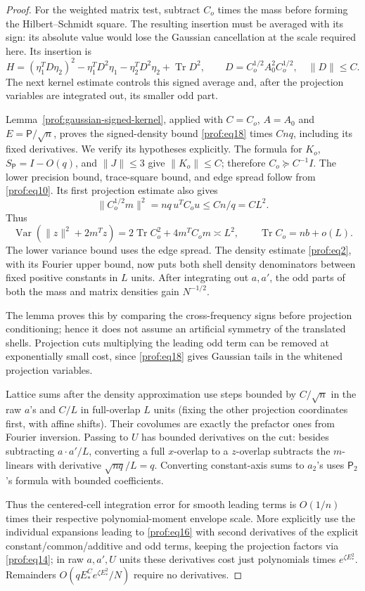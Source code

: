 \begin{proof}
For the weighted matrix test, subtract $C_o$ times the mass before
forming the Hilbert--Schmidt square. The resulting insertion must be
averaged with its sign: its absolute value would lose the Gaussian
cancellation at the scale required here. Its insertion is
\[
 H=(\eta_1^TD\eta_2)^2-\eta_1^TD^2\eta_1-
   \eta_2^TD^2\eta_2+\operatorname{Tr}D^2,
 \qquad D=C_o^{1/2}A_0^2C_o^{1/2},\quad \|D\|\le C.
\]
The next kernel estimate controls this signed average and, after the
projection variables are integrated out, its smaller odd part.

Lemma~\ref{prof:gaussian-signed-kernel}, applied with $C=C_o$,
$A=A_0$ and $E=\mathsf P/\sqrt n$, proves the signed-density bound
\eqref{prof:eq18} times $Cnq$, including its fixed derivatives.
We verify its hypotheses explicitly. The formula for $K_o$,
$S_{\mathsf P}=I-O(q)$, and $\|J\|\le3$ give $\|K_o\|\le C$;
therefore $C_o\succeq C^{-1}I$. The lower precision bound,
trace-square bound, and edge spread follow from \eqref{prof:eq10}.
Its first projection estimate also gives
\[
 \|C_o^{1/2}m\|^2=nq\,u^TC_ou\le Cn/q=CL^2.
\]
Thus
\[
 \operatorname{Var}(\|z\|^2+2m^Tz)
 =2\operatorname{Tr}C_o^2+4m^TC_om\asymp L^2,
 \qquad \operatorname{Tr}C_o=nb+o(L).
\]
The lower variance bound uses the edge spread. The density estimate
\eqref{prof:eq2}, with its Fourier upper bound, now puts both shell
density denominators between fixed positive constants in $L$ units.
After integrating out $a,a'$, the odd parts of both the mass and matrix
densities gain $N^{-1/2}$.

The lemma proves this by comparing the
cross-frequency signs before projection conditioning; hence it does
not assume an artificial symmetry of the translated shells.
Projection cuts multiplying the leading odd term can be removed at
exponentially small cost, since \eqref{prof:eq18} gives Gaussian tails
in the whitened projection variables.

Lattice sums after the density approximation use steps bounded by \(C/\sqrt n\) in the raw \(a\)'s and \(C/L\) in full-overlap \(L\) units (fixing the other projection coordinates first, with affine shifts). Their covolumes are exactly the prefactor ones from Fourier inversion. Passing to \(U\) has bounded derivatives on the cut: besides subtracting \(a\cdot a'/L\), converting a full \(x\)-overlap to a \(z\)-overlap subtracts the \(m\)-linears with derivative \(\sqrt{nq}/L=q\). Converting constant-axis sums to \(a_2\)'s uses \(\mathsf P_2\)'s formula with bounded coefficients.

Thus the centered-cell integration error for smooth leading terms is \(O(1/n)\) times their respective polynomial-moment envelope scale. More explicitly use the individual expansions leading to \eqref{prof:eq16} with second derivatives of the explicit constant/common/additive and odd terms, keeping the projection factors via \eqref{prof:eq14}; in raw \(a,a',U\) units these derivatives cost just polynomials times \(e^{\zeta E_*^2}\). Remainders \(O(q E_*^C e^{\zeta E_*^2}/N)\) require no derivatives.


\end{proof}

